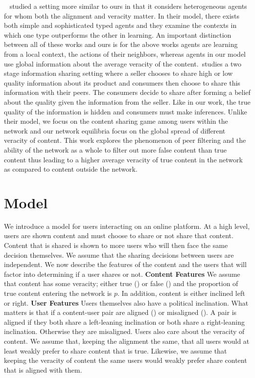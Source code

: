 ~\cite{mostagir2022learning} studied a setting more similar to ours in that it considers heterogeneous agents for whom both the alignment and veracity matter. In their model, there exists both simple and sophisticated typed agents and they examine the contexts in which one type outperforms the other in learning. An important distinction between all of these works and ours is for the above works agents are learning from a local context, the actions of their neighbors, whereas agents in our model use global information about the average veracity of the content.~\cite{kranton2024social}studies a two stage information sharing setting where a seller chooses to share high or low quality information about its product and consumers then choose to share this information with their peers. The consumers decide to share after forming a belief about the quality given the information from the seller. Like in our work, the true quality of the information is hidden and consumers must make inferences. Unlike their model, we focus on the content sharing game among users within the network and our network equilibria focus on the global spread of different veracity of content. This work explores the phenomenon of peer filtering and the ability of the network as a whole to filter out more false content than true content thus leading to a higher average veracity of true content in the network as compared to content outside the network.

\section{Model}
We introduce a model for users interacting on an online platform. At a high level, users are shown content and must choose to share or not share that content. Content that is shared is shown to more users who will then face the same decision themselves. We assume that the sharing decisions between users are independent. We now describe the features of the content and the users that will factor into determining if a user shares or not. 
\textbf{Content Features} We assume that content has some veracity; either true (\true) or false (\false) and the proportion of true content entering the network is $p$. In addition, content is either inclined left or right. 
\textbf{User Features} Users themselves also have a political inclination. What matters is that if a content-user pair are aligned (\alg) or misaligned (\mal). A pair is aligned if they both share a left-leaning inclination or both share a right-leaning inclination. Otherwise they are misaligned. Users also care about the veracity of content. We assume that, keeping the alignment the same, that all users would at least weakly prefer to share content that is true. Likewise, we assume that keeping the veracity of content the same users would weakly prefer share content that is aligned with them. 

